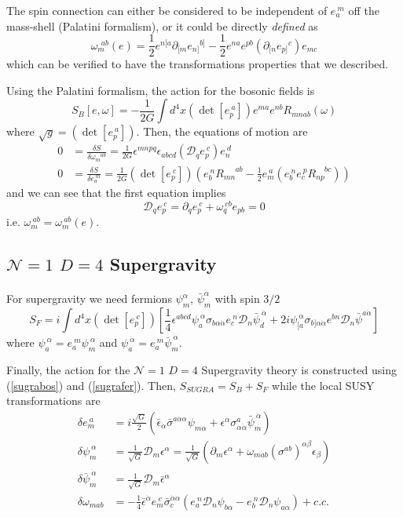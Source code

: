\documentclass[a4paper,12pt]{article}
\numberwithin{equation}{section}
\numberwithin{exe}{section}
\newcommand{\ph}[1]{\phantom{#1}}
\newcommand{\p}{{\partial}}
\newcommand{\Dc}{{\mathcal D}}
\renewcommand{\a}{{\alpha}}
\newcommand{\ad}{{\dot\alpha}}
\renewcommand{\b}{{\beta}}
\renewcommand{\d}{{\delta}}
\newcommand{\e}{{\epsilon}}
\newcommand{\eb}{{\bar\epsilon}}
\newcommand{\om}{\omega}
\newcommand{\s}{{\sigma}}
\renewcommand{\sb}{{\bar\sigma}}
\newcommand{\psib}{{\bar\psi}}
\begin{document}
The spin connection can either be considered to be independent of $e_a^{\ m}$ off the mass-shell (Palatini formalism), or it could be directly {\it defined} as
	\begin{equation}
	\om_m^{\ \ ab}(e) = \frac12 e^{n[a} \p_{[m} e_{n]}{}^{b]} - \frac12 e^{na} e^{pb} (\p_{[n} e_{p]}{}^{c}) e_{mc}
	\end{equation}
which can be verified to have the transformations properties that we described.

Using the Palatini formalism, the action for the bosonic fields is
	\begin{equation}\label{sugrabos}
	S_B[e,\om] = -\frac{1}{2G} \int d^4x (\det [e_p^{\ a}]) e^{ma} e^{nb} R_{mnab}(\om)
	\end{equation}
where $\sqrt g = (\det [e_p^{\ a}])$. Then, the equations of motion are
	\begin{align}
	0 & = \frac{\d S}{\d \om_m^{\ph{m}ab}} = \frac{1}{2G} \e^{mnpq} \e_{abcd} (\Dc_q e_p^{\ c}) e_n^{\ d} \\
	0 & = \frac{\d S}{\d e_a^{\ m}} = \frac{1}{2G} (\det [e_p^{\ c}]) \left(e_b^{\ n} R_{mn}^{\ph{mn}ab} - \frac12 e_m^{\ a} (e_b^{\ n} e_c^{\ p} R_{np}^{\ph{np}bc})\right)
	\end{align}
and we can see that the first equation implies
	\begin{equation}
	\Dc_q e_p^{\ c} = \p_q e_p^{\ c} + \om_q^{\ cb} e_{pb} = 0
	\end{equation}
i.e. $\om_m^{\ ab} = \om_m^{\ ab}(e)$.

\subsection{$\mathcal N=1$ $D=4$ Supergravity}
For supergravity we need fermions $\psi_m^\a$, $\psib_m^\ad$ with spin $3/2$
	\begin{equation}\label{sugrafer}
	S_F = i\int d^4x (\det[e_p^{\ c}]) \left[ \frac14 \e^{abcd} \psi_a^{\ \a} \s_{b\a\ad} e_c^{\ n} \Dc_n \psib_d^{\ \ad}  + 2i \psi_{[a}^{\ \a} \s_{b]\a\ad} e^{bn} \Dc_n \psib^{a\ad} \right]
	\end{equation}
where $\psi_a^{\ \a} = e_a^{\ m} \psi_m^{\ \a}$ and $\psi_a^{\ \ad} = e_a^{\ m} \psib_m^{\ \ad}$.

Finally, the action for the $\mathcal N=1$ $D=4$ Supergravity theory is constructed using (\ref{sugrabos}) and (\ref{sugrafer}). Then, $S_{SUGRA}=S_B + S_F$ while the local SUSY transformations are
	\begin{equation}
		\begin{aligned}
		\d e_m^{\ a} & = i\frac{\sqrt G}{2} (\eb_\ad \sb^{a\ad\a} \psi_{m\a} + \e^\a \s^a_{\a\ad} \psib_m^{\ \ad}) \\
		\d \psi_m^{\ \a} & = \frac{1}{\sqrt G} \Dc_m \e^\a = \frac{1}{\sqrt G} (\p_m\e^\a + \om_{mab}(\s^{ab})^{\a\b}\e_\b) \\
		\d\psib_m^{\ \ad} & = \frac{1}{\sqrt G} \Dc_m\eb^\ad \\
		\d \om_{mab} & = -\frac14 \eb^\ad e_m^{\ c} \sb_c^{\ad\a}(e_a^{\ n} \Dc_n\psi_{b\a} - e_b^{\ n}\Dc_n \psi_{a\a}) + c.c.
		\end{aligned}
	\end{equation}
\end{document}
